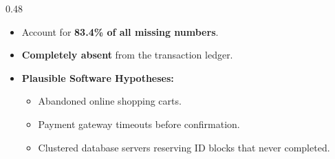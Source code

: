 \documentclass[aspectratio=169,10pt]{beamer}
\begin{document}
\begin{frame}[c]
\begin{columns}[t,onlytextwidth]
\begin{column}{0.48\textwidth}
{\begin{minipage}{\dimexpr\linewidth-2\fboxsep-2\fboxrule\relax}
          {\scriptsize
          \begin{itemize}
            \setlength{\itemsep}{0.08cm}
            \item Account for \textbf{83.4\% of all missing numbers}.
            \item \textbf{Completely absent} from the transaction ledger.
            \item \textbf{Plausible Software Hypotheses:}
            \begin{itemize}
              \setlength{\itemsep}{0.04cm}
              \item Abandoned online shopping carts.
              \item Payment gateway timeouts before confirmation.
              \item Clustered database servers reserving ID blocks that never completed.
            \end{itemize}
          \end{itemize}}
          \vspace{0.08cm}
        \end{minipage}
      }
    \end{column}
  \end{columns}
  
  \vspace{0.22cm}
  \begin{center}
    \setlength{\fboxrule}{1pt}
  \end{center}
\end{frame}
\end{document}
